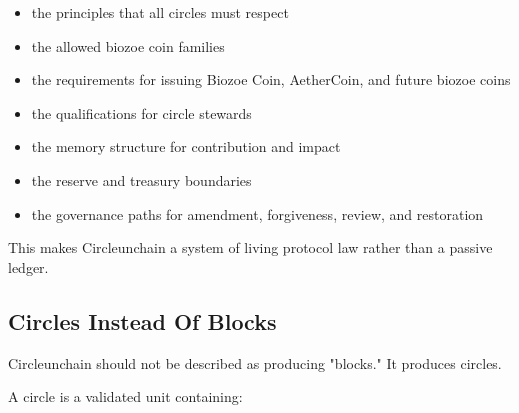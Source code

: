 ﻿\documentclass[12pt]{article}
\begin{document}
\begin{itemize}
  \item the principles that all circles must respect
\end{itemize}
\begin{itemize}
  \item the allowed biozoe coin families
\end{itemize}
\begin{itemize}
  \item the requirements for issuing Biozoe Coin, AetherCoin, and future biozoe coins
\end{itemize}
\begin{itemize}
  \item the qualifications for circle stewards
\end{itemize}
\begin{itemize}
  \item the memory structure for contribution and impact
\end{itemize}
\begin{itemize}
  \item the reserve and treasury boundaries
\end{itemize}
\begin{itemize}
  \item the governance paths for amendment, forgiveness, review, and restoration
\end{itemize}

This makes Circleunchain a system of living protocol law rather than a passive ledger.

\subsection{Circles Instead Of Blocks}


Circleunchain should not be described as producing "blocks." It produces circles.

A circle is a validated unit containing:
\end{document}
